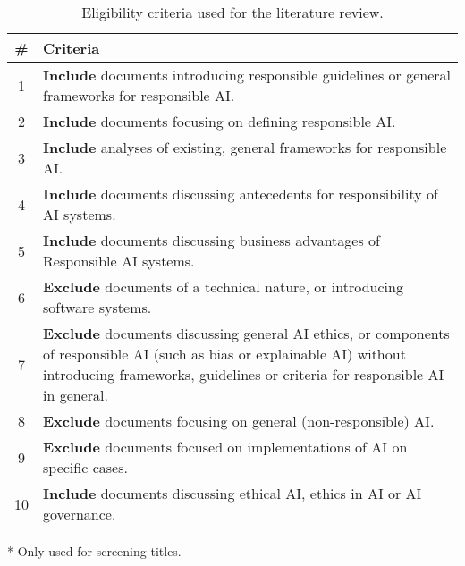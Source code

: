 \begin{table}[ht]
    \centering
    \caption{Eligibility criteria used for the literature review.}
    \label{tab:criteria}
    \begin{threeparttable}
    \begin{tabular}{cp{}}
    \toprule
        \textbf{\#} & \textbf{Criteria} \\
    \midrule
        1 & \textbf{Include} documents introducing responsible guidelines or general frameworks for responsible AI. \\
        2 & \textbf{Include} documents focusing on defining responsible AI. \\
        3 & \textbf{Include} analyses of existing, general frameworks for responsible AI. \\
        4 & \textbf{Include} documents discussing antecedents for responsibility of AI systems. \\
        5 & \textbf{Include} documents discussing business advantages of Responsible AI systems. \\
        \midrule
        6 & \textbf{Exclude} documents of a technical nature, or introducing software systems. \\ %
        7 & \textbf{Exclude} documents discussing general AI ethics, or components of responsible AI (such as bias or explainable AI) without introducing frameworks, guidelines or criteria for responsible AI in general. \\
        8 & \textbf{Exclude} documents focusing on general (non-responsible) AI. \\ %
        9 & \textbf{Exclude} documents focused on implementations of AI on specific cases. \\ %
        \midrule
        10\tnote{*} & \textbf{Include} documents discussing ethical AI, ethics in AI or AI governance. \\
    \bottomrule
    \end{tabular}
    \begin{tablenotes}
        \footnotesize
        \item [*] Only used for screening titles.
    \end{tablenotes}
\end{threeparttable}
\end{table}


